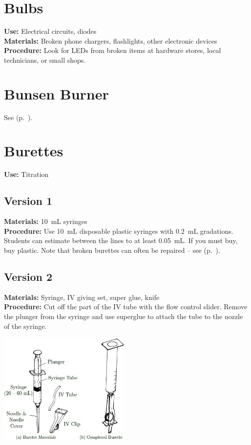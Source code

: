\begin{multicols}{2}
\columnbreak

\section{Bulbs} 
\label{sec:lightbulbs}
\vspace{-10pt}
\textbf{Use:} Electrical circuits, diodes\\
\textbf{Materials:} Broken phone chargers, flashlights, other electronic devices\\
\textbf{Procedure:} Look for LEDs from broken items at hardware stores, local technicians, or small shops. 

\section{Bunsen Burner} 
\label{sec:bunsen-burner}
See  (p.~\pageref{sec:heatsources}).

\section{Burettes} 
\label{sec:burettes}
\vspace{-10pt}
\textbf{Use:} Titration

\subsection{Version 1}
\vspace{-6pt}
\textbf{Materials:} 10~mL syringes \\
\textbf{Procedure:} Use 10~mL disposable plastic syringes with 0.2~mL gradations. Students can estimate between the lines to at least 0.05~mL. If you must buy, buy plastic. Note that broken burettes can often be repaired -- see  (p.~\pageref{cha:burettes}).

\subsection{Version 2}
\vspace{-6pt}
\textbf{Materials:} Syringe, IV giving set, super glue, knife\\
\textbf{Procedure:} Cut off the part of the IV tube with the 
flow
control slider. Remove the plunger from the syringe and use superglue to
attach the tube to the nozzle of the syringe.
\begin{center}
\includegraphics[width=0.49\textwidth]{./img/burette.jpg}
\end{center}


\end{multicols}
